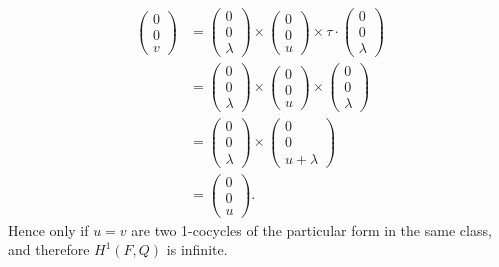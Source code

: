 \begin{align*}
	\left(\begin{matrix} 0 \\ 0 \\ v\end{matrix}\right) &=
	\left(\begin{matrix} 0 \\ 0 \\ \lambda\end{matrix}\right) \times
	\left(\begin{matrix} 0 \\ 0 \\ u\end{matrix}\right) \times
	\tau\cdot\left(\begin{matrix} 0 \\ 0 \\ \lambda\end{matrix}\right)\\
	&=
	\left(\begin{matrix} 0 \\ 0 \\ \lambda\end{matrix}\right) \times
	\left(\begin{matrix} 0 \\ 0 \\ u\end{matrix}\right) \times
	\left(\begin{matrix} 0 \\ 0 \\ \lambda\end{matrix}\right)\\
	&=
	\left(\begin{matrix} 0 \\ 0 \\ \lambda\end{matrix}\right) \times
	\left(\begin{matrix} 0 \\ 0 \\ u + \lambda\end{matrix}\right) \\
	&=
	\left(\begin{matrix} 0 \\ 0 \\ u\end{matrix}\right).
\end{align*}
Hence only if $u=v$ are two 1-cocycles of the particular form in the same class, and therefore $H^1(F, Q)$ is infinite.


